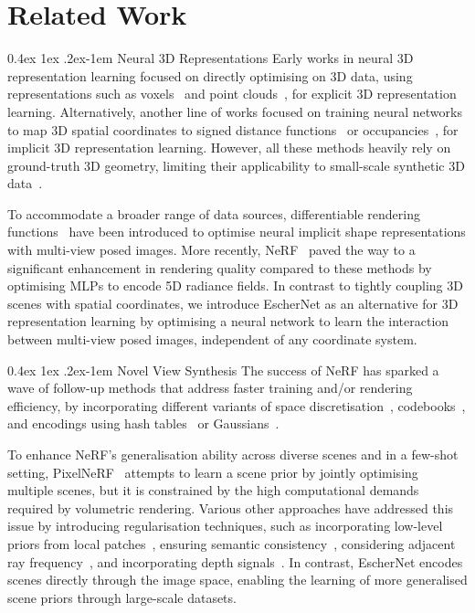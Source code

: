 \documentclass[10pt,twocolumn,letterpaper]{article}
\makeatletter
\renewcommand{\paragraph}{%
  \@startsection{paragraph}{4}%
  {\z@}{0.4ex \@plus 1ex \@minus .2ex}{-1em}%
  {\normalfont\normalsize\bfseries}%
}
\makeatother
\begin{document}
\section{Related Work}


\paragraph{Neural 3D Representations} 
Early works in neural 3D representation learning focused on directly optimising on 3D data, using representations such as voxels~\cite{maturana2015voxnet} and point clouds~\cite{qi2017pointnet, qi2017pointnet++}, for explicit 3D representation learning. Alternatively, another line of works focused on training neural networks to map 3D spatial coordinates to signed distance functions~\cite{park2019deepsdf} or occupancies~\cite{mescheder2019occupancy, Peng2020ECCV}, for implicit 3D representation learning. However, all these methods heavily rely on ground-truth 3D geometry, limiting their applicability to small-scale synthetic 3D data~\cite{wu20153dshapenet,chang2015shapenet}.

To accommodate a broader range of data sources, differentiable rendering functions~\cite{niemeyer2020differentiable, sitzmann2019scene} have been introduced to optimise neural implicit shape representations with multi-view posed images. More recently, NeRF~\cite{mildenhall2020nerf} paved the way to a significant enhancement in rendering quality compared to these methods by optimising MLPs to encode 5D radiance fields. In contrast to tightly coupling 3D scenes with spatial coordinates, we introduce EscherNet as an alternative for 3D representation learning by optimising a neural network to learn the interaction between multi-view posed images, independent of any coordinate system.


\paragraph{Novel View Synthesis}
The success of NeRF has sparked a wave of follow-up methods that address faster training and/or rendering efficiency, by incorporating different variants of space discretisation~\cite{garbin2021fastnerf,hedman2021baking,chen2022tensorf},  codebooks~\cite{takikawa2022variable}, and encodings using hash tables~\cite{muller2022instant} or Gaussians~\cite{kerbl20233gaussian}.

To enhance NeRF's generalisation ability across diverse scenes and in a few-shot setting, PixelNeRF~\cite{yu2021pixelnerf} attempts to learn a scene prior by jointly optimising multiple scenes, but it is constrained by the high computational demands required by volumetric rendering. Various other approaches have addressed this issue by introducing regularisation techniques, such as incorporating low-level priors from local patches~\cite{niemeyer2022regnerf}, ensuring semantic consistency~\cite{jain2021dietnerf}, considering adjacent ray frequency~\cite{yang2023freenerf}, and incorporating depth signals~\cite{deng2022depth}. In contrast, EscherNet encodes scenes directly through the image space, enabling the learning of more generalised scene priors through large-scale datasets.
\end{document}
